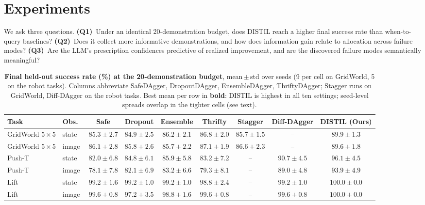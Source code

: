 \documentclass[letterpaper]{article} %
\begin{document}
\section{Experiments}
\label{sec:experiments}

We ask three questions. \textbf{(Q1)}~Under an identical 20-demonstration
budget, does DISTIL reach a higher final success rate than when-to-query
baselines? \textbf{(Q2)}~Does it collect more informative demonstrations,
and how does information gain relate to allocation across failure modes?
\textbf{(Q3)}~Are the LLM's prescription confidences predictive of realized
improvement, and are the discovered failure modes semantically meaningful?

\begin{table}[t]
\centering
\small
\setlength{\tabcolsep}{4pt}
\caption{\textbf{Final held-out success rate (\%) at the 20-demonstration
budget}, mean\,$\pm$\,std over seeds (9 per cell on GridWorld, 5 on the
robot tasks). Columns abbreviate SafeDAgger, DropoutDAgger, EnsembleDAgger,
ThriftyDAgger; Stagger runs on GridWorld, Diff-DAgger on the robot tasks.
Best mean per row in \textbf{bold}: DISTIL is highest in all ten settings;
seed-level spreads overlap in the tighter cells (see text).}
\label{tab:main}
\begin{tabular}{llccccccc}
\toprule
Task & Obs.\ & Safe & Dropout & Ensemble & Thrifty & Stagger & Diff-DAgger & DISTIL (Ours) \\
\midrule
GridWorld $5{\times}5$ & state & $85.3 \pm 2.7$ & $84.9 \pm 2.5$ & $86.2 \pm 2.1$ & $86.8 \pm 2.0$ & $85.7 \pm 1.5$ & -- &$\mathbf{89.9 \pm 1.3}$ \\
GridWorld $5{\times}5$ & image & $86.1 \pm 2.8$ & $85.8 \pm 2.6$ & $85.7 \pm 2.2$ & $87.1 \pm 1.9$ & $86.6 \pm 2.3$ & -- &$\mathbf{89.6 \pm 1.8}$ \\
\addlinespace
Push-T & state & $82.0 \pm 6.8$ & $84.8 \pm 6.1$ & $85.9 \pm 5.8$ & $83.2 \pm 7.2$ & -- &$90.7 \pm 4.5$ & $\mathbf{96.1 \pm 4.5}$ \\
Push-T & image & $78.1 \pm 7.8$ & $82.1 \pm 6.9$ & $83.2 \pm 6.6$ & $79.3 \pm 8.1$ & -- &$89.0 \pm 4.8$ & $\mathbf{93.9 \pm 4.9}$ \\
\addlinespace
Lift & state & $99.2 \pm 1.6$ & $99.2 \pm 1.0$ & $99.2 \pm 1.0$ & $98.8 \pm 2.4$ & -- &$99.2 \pm 1.0$ & $\mathbf{100.0 \pm 0.0}$ \\
Lift & image & $99.6 \pm 0.8$ & $97.2 \pm 3.5$ & $98.8 \pm 1.6$ & $99.6 \pm 0.8$ & -- &$99.6 \pm 0.8$ & $\mathbf{100.0 \pm 0.0}$ \\

\end{tabular}
\end{table}
\end{document}

